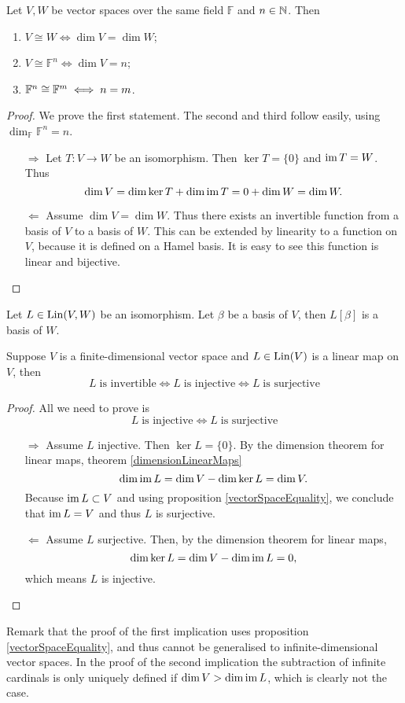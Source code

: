 \begin{proposition} \label{isomorphicDimension}
Let $V,W$ be vector spaces over the same field $\mathbb{F}$ and $n\in \mathbb{N}$. Then
\begin{enumerate}
\item $V\cong W \iff \dim V = \dim W$;
\item $V \cong \mathbb{F}^n \iff \dim V = n$;
\item $\mathbb{F}^n \cong \mathbb{F}^m \iff n=m$.
\end{enumerate}
\end{proposition}
\begin{proof}
We prove the first statement. The second and third follow easily, using $\dim_\mathbb{F} \mathbb{F}^n = n$.
\begin{itemize}
\item[$\boxed{\Rightarrow}$] Let $T:V\to W$ be an isomorphism. Then $\ker T = \{0\}$ and $\operatorname{im} T = W$. Thus
\[ \dim V = \dim \ker T + \dim \operatorname{im} T = 0 + \dim W = \dim W. \]
\item[$\boxed{\Leftarrow}$] Assume $\dim V = \dim W$. Thus there exists an invertible function from a basis of $V$ to a basis of $W$. This can be extended by linearity to a function on $V$, because it is defined on a Hamel basis. It is easy to see this function is linear and bijective.
\end{itemize}
\end{proof}

\begin{proposition} \label{mappingOfBasisByIsomorphism}
Let $L\in\operatorname{Lin}(V,W)$ be an isomorphism. Let $\beta$ be a basis of $V$, then $L[\beta]$ is a basis of $W$.
\end{proposition}

\begin{proposition} \label{invertibleFiniteDim}
Suppose $V$ is a finite-dimensional vector space and $L\in \operatorname{Lin}(V)$ is a linear map on $V$, then
\[ L \;\text{is invertible} \iff L \;\text{is injective} \iff L \;\text{is surjective} \]
\end{proposition}
\begin{proof}
All we need to prove is
\[ L \;\text{is injective} \iff L \;\text{is surjective} \]
\begin{itemize}
\item[$\boxed{\Rightarrow}$] Assume $L$ injective. Then $\ker L = \{0\}$. By the dimension theorem for linear maps, theorem \ref{dimensionLinearMaps}
\[ \dim \operatorname{im} L = \dim V - \dim \ker L = \dim V. \]
Because $\operatorname{im} L \subset V$ and using proposition \ref{vectorSpaceEquality}, we conclude that $\operatorname{im} L = V$ and thus $L$ is surjective.
\item[$\boxed{\Leftarrow}$] Assume $L$ surjective. Then, by the dimension theorem for linear maps,
\[ \dim \ker L = \dim V - \dim \operatorname{im} L = 0, \]
which means $L$ is injective.
\end{itemize}
\end{proof}
Remark that the proof of the first implication uses proposition \ref{vectorSpaceEquality}, and thus cannot be generalised to infinite-dimensional vector spaces. In the proof of the second implication the subtraction of infinite cardinals is only uniquely defined if  $\dim V > \dim \operatorname{im} L$, which is clearly not the case.

